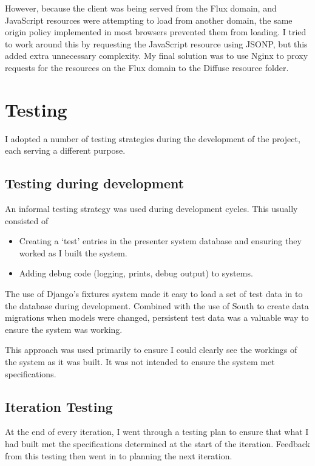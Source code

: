 \documentclass[a4papert,11pt,notitlepage]{ltxdoc}
\begin{document}
However, because the client was being served from the Flux domain, and JavaScript resources were attempting to load from another domain, the same origin policy implemented in most browsers prevented them from loading. I tried to work around this by requesting the JavaScript resource using JSONP, but this added extra unnecessary complexity. My final solution was to use Nginx to proxy requests for the resources on the Flux domain to the Diffuse resource folder.


\section{Testing}
I adopted a number of testing strategies during the development of the project, each serving a different purpose.

\subsection{Testing during development}
An informal testing strategy was used during development cycles. This usually consisted of
\begin{itemize}
\item Creating a `test' entries in the presenter system database and ensuring they worked as I built the system. 
\item Adding debug code (logging, prints, debug output) to systems.
\end{itemize}

The use of Django's fixtures system made it easy to load a set of test data in to the database during development. Combined with the use of South\cite{south:web} to create data migrations when models were changed, persistent test data was a valuable way to ensure the system was working.

This approach was used primarily to ensure I could clearly see the workings of the system as it was built. It was not intended to ensure the system met specifications.


\subsection{Iteration Testing}
At the end of every iteration, I went through a testing plan to ensure that what I had built met the specifications determined at the start of the iteration. Feedback from this testing then went in to planning the next iteration.
\end{document}
